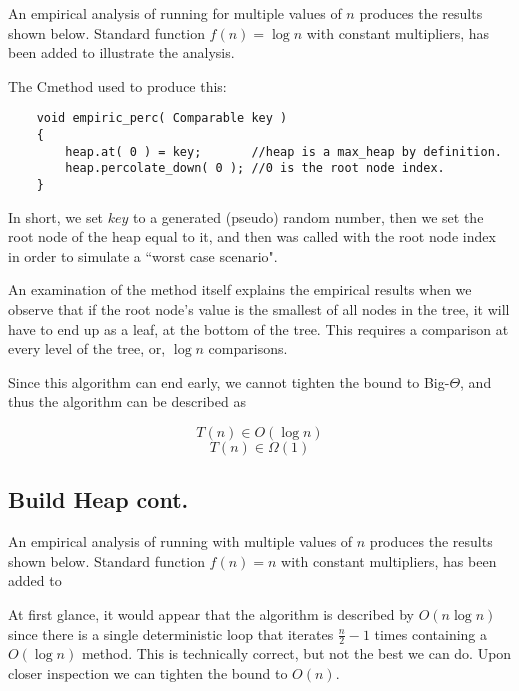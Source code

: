 \documentclass[11pt]{article}
\def\CC{{C\nolinebreak[4]\hspace{-.05em}\raisebox{.4ex}{\tiny\bf ++ }}}
\begin{document}
An empirical analysis of running  for multiple values of $n$ produces the results shown below. Standard function $f(n) = \log n$ with constant multipliers, has been added to illustrate the analysis.

\clearpage
\begin{center}
    
\end{center}

The \CC method used to produce this:

\begin{lstlisting}
    void empiric_perc( Comparable key )
    {
        heap.at( 0 ) = key; 	  //heap is a max_heap by definition.
        heap.percolate_down( 0 ); //0 is the root node index.
    }
\end{lstlisting}

In short, we set $key$ to a generated (pseudo) random number, then we set the root node of the heap equal to it, and then  was called with the root node index in order to simulate a ``worst case scenario".

An examination of the  method itself explains the empirical results when we observe that if the root node's value is the smallest of all nodes in the tree, it will have to end up as a leaf, at the bottom of the tree. This requires a comparison at every level of the tree, or, $\log n$ comparisons.

Since this algorithm can end early, we cannot tighten the bound to Big-$\Theta$, and thus the  algorithm can be described as 

\[
T(n) \in O( \log n)
\]
\[
T(n) \in \Omega(1)
\]
\clearpage
\subsection{Build Heap cont.}

An empirical analysis of running  with multiple values of $n$ produces the results shown below. Standard function $f(n) = n$ with constant multipliers, has been added to

\begin{center}
    
\end{center}

At first glance, it would appear that the algorithm is described by $O(n \log n)$ since there is a single deterministic loop that iterates $\frac{n}{2} - 1$ times containing a $O(\log n)$ method. This is technically correct, but not the best we can do.
Upon closer inspection we can tighten the bound to $O(n)$.
\end{document}
